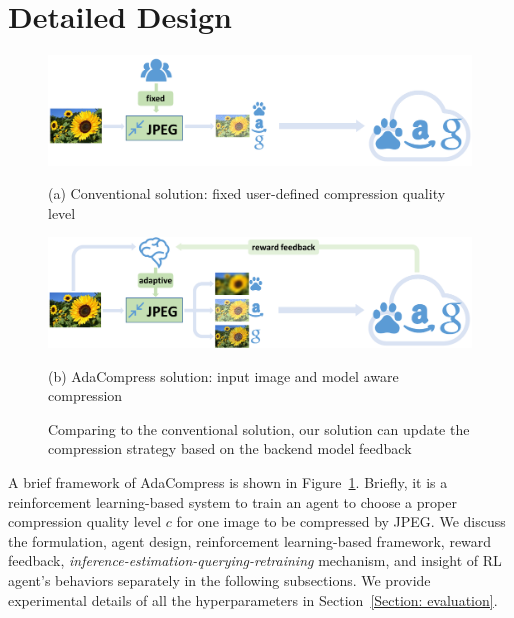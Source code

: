 \section{Detailed Design}
\label{Section: design}

\begin{figure}[!t]
	\begin{minipage}{\linewidth}
		\centerline{\includegraphics[width=0.8\linewidth]{figures/conventional-framework.pdf}}
		\begin{center}
			{(a) Conventional solution: fixed user-defined compression quality level}
		\end{center}
	\end{minipage}
	\vfill
	\vspace{0.4cm}
	\begin{minipage}{\linewidth}
		\centerline{\includegraphics[width=0.8\linewidth]{figures/adaptive-framework.pdf}}
		\vspace{0.2cm}
		\begin{center}
			{(b) AdaCompress solution: input image and model aware compression}
		\end{center}
	\end{minipage}
	\caption{Comparing to the conventional solution, our solution can update the compression strategy based on the backend model feedback}
	\label{fig: framework}
\end{figure}

A brief framework of AdaCompress is shown in Figure~\ref{fig: framework}. Briefly, it is a reinforcement learning-based system to train an agent to choose a proper compression quality level $ c $ for one image to be compressed by JPEG. We discuss the formulation, agent design, reinforcement learning-based framework, reward feedback, \emph{inference-estimation-querying-retraining} mechanism, and insight of RL agent's behaviors separately in the following subsections. We provide experimental details of all the hyperparameters in Section~\ref{Section: evaluation}. %

